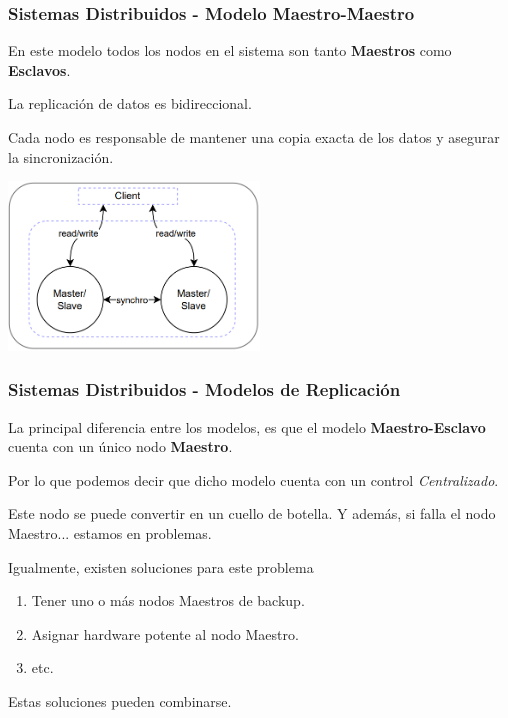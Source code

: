 \begin{frame}
    \frametitle{Sistemas Distribuidos - Modelo Maestro-Maestro}

    En este modelo todos los nodos en el sistema son tanto \textbf{Maestros} como \textbf{Esclavos}.

     

    La replicación de datos es bidireccional.

     

    Cada nodo es responsable de mantener una copia exacta de los datos y asegurar la sincronización.

     

    \begin{center}
        \includegraphics[width=0.5\textwidth]{diagramas/maestro-maestro.png}
    \end{center}
    
\end{frame}

\begin{frame}
    \frametitle{Sistemas Distribuidos - Modelos de Replicación}

    La principal diferencia entre los modelos, es que el modelo \textbf{Maestro-Esclavo} cuenta con un único nodo \textbf{Maestro}.

     

    Por lo que podemos decir que dicho modelo cuenta con un control \textit{Centralizado}.

     

    Este nodo se puede convertir en un cuello de botella.   Y además, si falla el nodo Maestro...   estamos en problemas.

     

    Igualmente, existen soluciones para este problema 
    
    \begin{enumerate}
        \item Tener uno o más nodos Maestros de backup.  
        \item Asignar hardware potente al nodo Maestro.  
        \item etc.
    \end{enumerate}

     

    Estas soluciones pueden combinarse.
    
\end{frame}

